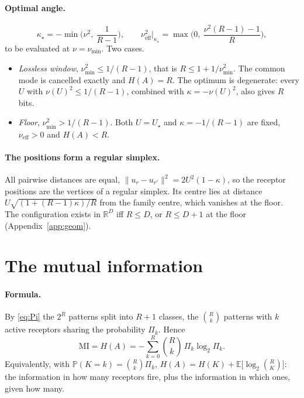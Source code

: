 \documentclass[11pt,a4paper]{article}
\newcommand{\RR}{\mathbb{R}}
\newcommand{\EE}{\mathbb{E}}
\newcommand{\PP}{\mathbb{P}}
\newcommand{\nueff}{\nu_{\mathrm{eff}}}
\begin{document}
\paragraph{Optimal angle.}
\begin{equation}
  \boxed{\;\kappa_\star=-\min\Big(\nu^2,\ \frac{1}{R-1}\Big),
  \qquad
  \nueff^2\big|_{\kappa_\star}=\max\Big(0,\ \frac{\nu^2(R-1)-1}{R}\Big),\;}
  \label{eq:kstar}
\end{equation}
to be evaluated at $\nu=\nu_{\min}$. Two cases.
\begin{itemize}
\item \emph{Lossless window}, $\nu_{\min}^2\le1/(R-1)$, that is $R\le1+1/\nu_{\min}^2$.
  The common mode is cancelled exactly and $H(A)=R$. The optimum is degenerate: every $U$
  with $\nu(U)^2\le1/(R-1)$, combined with $\kappa=-\nu(U)^2$, also gives $R$ bits.
\item \emph{Floor}, $\nu_{\min}^2>1/(R-1)$. Both $U=U_\star$ and $\kappa=-1/(R-1)$ are
  fixed, $\nueff>0$ and $H(A)<R$.
\end{itemize}

\paragraph{The positions form a regular simplex.} All pairwise distances are equal,
$\|u_r-u_{r'}\|^2=2U^2(1-\kappa)$, so the receptor positions are the vertices of a regular
simplex. Its centre lies at distance $U\sqrt{(1+(R-1)\kappa)/R}$ from the family centre,
which vanishes at the floor. The configuration exists in $\RR^D$ iff $R\le D$, or
$R\le D+1$ at the floor (Appendix~\ref{app:geom}).

\section{The mutual information}
\label{sec:mi}

\paragraph{Formula.} By \eqref{eq:Pi} the $2^R$ patterns split into $R+1$ classes, the
$\binom Rk$ patterns with $k$ active receptors sharing the probability $\Pi_k$. Hence
\begin{equation}
  \mathrm{MI}=H(A)=-\sum_{k=0}^{R}\binom Rk\,\Pi_k\log_2\Pi_k .
  \label{eq:H}
\end{equation}
Equivalently, with $\PP(K=k)=\binom Rk\Pi_k$,
$H(A)=H(K)+\EE\big[\log_2\binom RK\big]$: the information in how many receptors fire, plus
the information in which ones, given how many.
\end{document}
